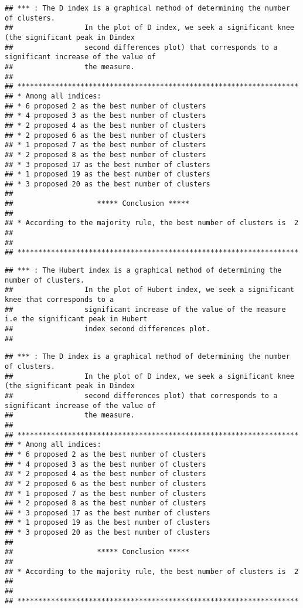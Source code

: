 \documentclass[]{article}
\begin{document}
\begin{verbatim}
## *** : The D index is a graphical method of determining the number of clusters. 
##                 In the plot of D index, we seek a significant knee (the significant peak in Dindex
##                 second differences plot) that corresponds to a significant increase of the value of
##                 the measure. 
##  
## ******************************************************************* 
## * Among all indices:                                                
## * 6 proposed 2 as the best number of clusters 
## * 4 proposed 3 as the best number of clusters 
## * 2 proposed 4 as the best number of clusters 
## * 2 proposed 6 as the best number of clusters 
## * 1 proposed 7 as the best number of clusters 
## * 2 proposed 8 as the best number of clusters 
## * 3 proposed 17 as the best number of clusters 
## * 1 proposed 19 as the best number of clusters 
## * 3 proposed 20 as the best number of clusters 
## 
##                    ***** Conclusion *****                            
##  
## * According to the majority rule, the best number of clusters is  2 
##  
##  
## *******************************************************************
\end{verbatim}

\newpage

\begin{verbatim}
## *** : The Hubert index is a graphical method of determining the number of clusters.
##                 In the plot of Hubert index, we seek a significant knee that corresponds to a 
##                 significant increase of the value of the measure i.e the significant peak in Hubert
##                 index second differences plot. 
## 
\end{verbatim}

\begin{verbatim}
## *** : The D index is a graphical method of determining the number of clusters. 
##                 In the plot of D index, we seek a significant knee (the significant peak in Dindex
##                 second differences plot) that corresponds to a significant increase of the value of
##                 the measure. 
##  
## ******************************************************************* 
## * Among all indices:                                                
## * 6 proposed 2 as the best number of clusters 
## * 4 proposed 3 as the best number of clusters 
## * 2 proposed 4 as the best number of clusters 
## * 2 proposed 6 as the best number of clusters 
## * 1 proposed 7 as the best number of clusters 
## * 2 proposed 8 as the best number of clusters 
## * 3 proposed 17 as the best number of clusters 
## * 1 proposed 19 as the best number of clusters 
## * 3 proposed 20 as the best number of clusters 
## 
##                    ***** Conclusion *****                            
##  
## * According to the majority rule, the best number of clusters is  2 
##  
##  
## *******************************************************************
\end{verbatim}
\end{document}
